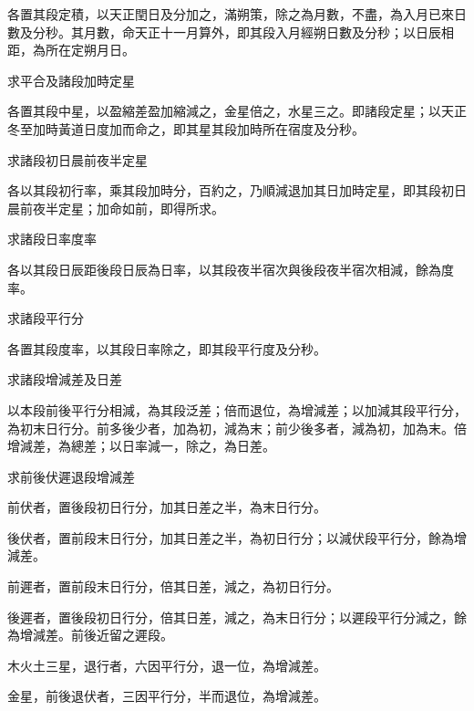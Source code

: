\begin{pinyinscope}
 各置其段定積，以天正閏日及分加之，滿朔策，除之為月數，不盡，為入月已來日數及分秒。其月數，命天正十一月算外，即其段入月經朔日數及分秒；以日辰相距，為所在定朔月日。



 求平合及諸段加時定星



 各置其段中星，以盈縮差盈加縮減之，金星倍之，水星三之。即諸段定星；以天正冬至加時黃道日度加而命之，即其星其段加時所在宿度及分秒。



 求諸段初日晨前夜半定星



 各以其段初行率，乘其段加時分，百約之，乃順減退加其日加時定星，即其段初日晨前夜半定星；加命如前，即得所求。



 求諸段日率度率



 各以其段日辰距後段日辰為日率，以其段夜半宿次與後段夜半宿次相減，餘為度率。



 求諸段平行分



 各置其段度率，以其段日率除之，即其段平行度及分秒。



 求諸段增減差及日差



 以本段前後平行分相減，為其段泛差；倍而退位，為增減差；以加減其段平行分，為初末日行分。前多後少者，加為初，減為末；前少後多者，減為初，加為末。倍增減差，為總差；以日率減一，除之，為日差。



 求前後伏遲退段增減差



 前伏者，置後段初日行分，加其日差之半，為末日行分。



 後伏者，置前段末日行分，加其日差之半，為初日行分；以減伏段平行分，餘為增減差。



 前遲者，置前段末日行分，倍其日差，減之，為初日行分。



 後遲者，置後段初日行分，倍其日差，減之，為末日行分；以遲段平行分減之，餘為增減差。前後近留之遲段。



 木火土三星，退行者，六因平行分，退一位，為增減差。



 金星，前後退伏者，三因平行分，半而退位，為增減差。




\end{pinyinscope}
